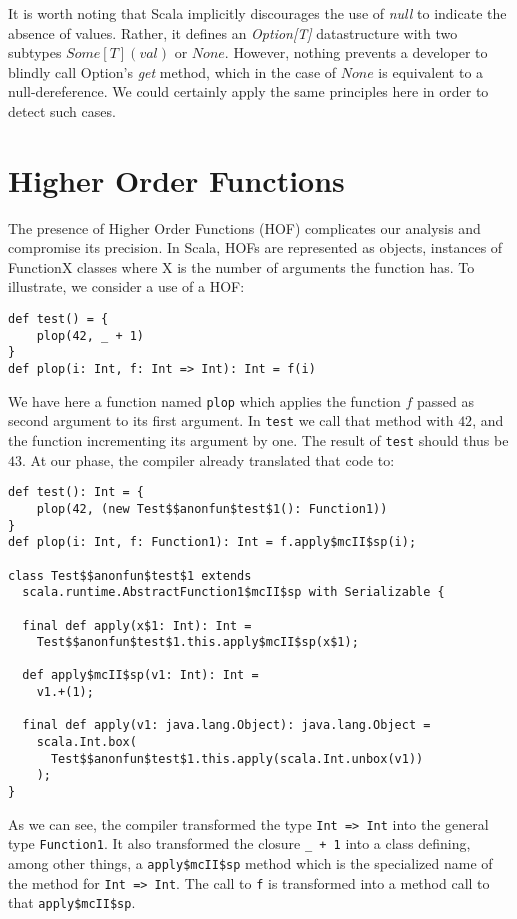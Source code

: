 It is worth noting that Scala implicitly discourages the use of \emph{null} to
indicate the absence of values. Rather, it defines an \emph{Option[T]}
datastructure with two subtypes $Some[T](val)$ or $None$. However,
nothing prevents a developer to blindly call Option's \emph{get} method, which
in the case of $None$ is equivalent to a null-dereference. We could certainly
apply the same principles here in order to detect such cases.

\section{Higher Order Functions}
The presence of Higher Order Functions (HOF) complicates our analysis and
compromise its precision. In Scala, HOFs are represented as objects, instances
of FunctionX classes where X is the number of arguments the function has. To
illustrate, we consider a use of a HOF:
\begin{lstlisting}
def test() = {
    plop(42, _ + 1)
}
def plop(i: Int, f: Int => Int): Int = f(i)
\end{lstlisting}
We have here a function named \lstinline{plop} which applies the function $f$ passed
as second argument to its first argument. In \lstinline{test} we call that method
with $42$, and the function incrementing its argument by one. The result of
\lstinline{test} should thus be $43$. At our phase, the compiler already
translated that code to:
\begin{lstlisting}
def test(): Int = {
    plop(42, (new Test$$anonfun$test$1(): Function1))
}
def plop(i: Int, f: Function1): Int = f.apply$mcII$sp(i);

class Test$$anonfun$test$1 extends
  scala.runtime.AbstractFunction1$mcII$sp with Serializable {

  final def apply(x$1: Int): Int =
    Test$$anonfun$test$1.this.apply$mcII$sp(x$1);

  def apply$mcII$sp(v1: Int): Int =
    v1.+(1);

  final def apply(v1: java.lang.Object): java.lang.Object =
    scala.Int.box(
      Test$$anonfun$test$1.this.apply(scala.Int.unbox(v1))
    );
}

\end{lstlisting}
As we can see, the compiler transformed the type \lstinline{Int => Int} into
the general type \lstinline{Function1}. It also transformed the closure
\lstinline{_ + 1} into a class defining, among other things, a
\lstinline{apply$mcII$sp} method which is the specialized name of the method
for \lstinline{Int => Int}. The call to \lstinline{f} is transformed into a
method call to that \lstinline{apply$mcII$sp}.

